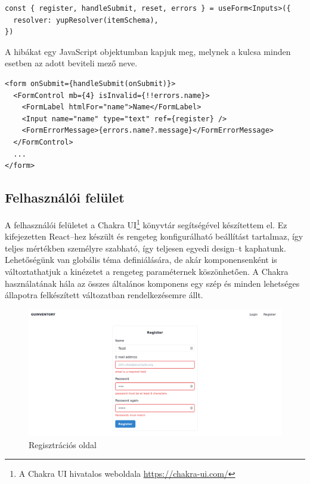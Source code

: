 \begin{lstlisting}[style=ES6, caption={Regisztrációnál használt form hook}]
const { register, handleSubmit, reset, errors } = useForm<Inputs>({
  resolver: yupResolver(itemSchema),
})
\end{lstlisting}

A hibákat egy JavaScript objektumban kapjuk meg, melynek a kulcsa minden esetben az adott beviteli mező neve.

\begin{lstlisting}[style=ES6, caption={Form hibák megjelenítésével}]
<form onSubmit={handleSubmit(onSubmit)}>
  <FormControl mb={4} isInvalid={!!errors.name}>
    <FormLabel htmlFor="name">Name</FormLabel>
    <Input name="name" type="text" ref={register} />
    <FormErrorMessage>{errors.name?.message}</FormErrorMessage>
  </FormControl>
  ...
</form>
\end{lstlisting}


\subsection{Felhasználói felület}
A felhasználói felületet a Chakra UI\footnote{A Chakra UI hivatalos weboldala \url{https://chakra-ui.com/}} könyvtár segítségével készítettem el. Ez kifejezetten React–hez készült és rengeteg konfigurálható beállítást tartalmaz, így teljes mértékben személyre szabható, így teljesen egyedi design–t kaphatunk. Lehetőségünk van globális téma definiálására, de akár komponensenként is változtathatjuk a kinézetet a rengeteg paraméternek köszönhetően.
A Chakra használatának hála az összes általános komponens egy szép és minden lehetséges állapotra felkészített változatban rendelkezésemre állt.

\begin{figure}[!ht]
  \centering
  \includegraphics[width=150mm, keepaspectratio]{figures/reg.png}
  \caption{Regisztrációs oldal}
  \label{fig:reg}
\end{figure}

